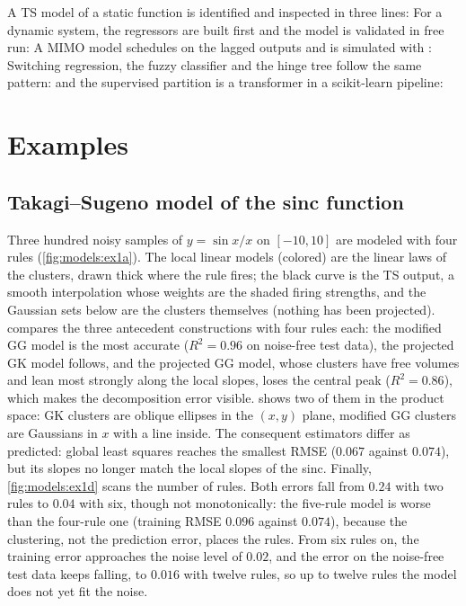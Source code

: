 A TS model of a static function is identified and inspected in three lines:
For a dynamic system, the regressors are built first and the model is validated in free run:
A MIMO model schedules on the lagged outputs and is simulated with :
Switching regression, the fuzzy classifier and the hinge tree follow the same pattern:
and the supervised partition is a transformer in a scikit-learn pipeline:

\section{Examples}\label{sec:models:examples}

\subsection{Takagi--Sugeno model of the sinc function}

Three hundred noisy samples of $y=\sin x/x$ on $[-10,10]$ are modeled with four rules (\cref{fig:models:ex1a}). The local linear models (colored) are the linear laws of the clusters, drawn thick where the rule fires; the black curve is the TS output, a smooth interpolation whose weights are the shaded firing strengths, and the Gaussian sets below are the clusters themselves (nothing has been projected).  compares the three antecedent constructions with four rules each: the modified GG model is the most accurate ($R^2=0.96$ on noise-free test data), the projected GK model follows, and the projected GG model, whose clusters have free volumes and lean most strongly along the local slopes, loses the central peak ($R^2=0.86$), which makes the decomposition error visible.  shows two of them in the product space: GK clusters are oblique ellipses in the $(x,y)$ plane, modified GG clusters are Gaussians in $x$ with a line inside. The consequent estimators differ as predicted: global least squares reaches the smallest RMSE ($0.067$ against $0.074$), but its slopes no longer match the local slopes of the sinc. Finally, \cref{fig:models:ex1d} scans the number of rules. Both errors fall from $0.24$ with two rules to $0.04$ with six, though not monotonically: the five-rule model is worse than the four-rule one (training RMSE $0.096$ against $0.074$), because the clustering, not the prediction error, places the rules. From six rules on, the training error approaches the noise level of $0.02$, and the error on the noise-free test data keeps falling, to $0.016$ with twelve rules, so up to twelve rules the model does not yet fit the noise.


